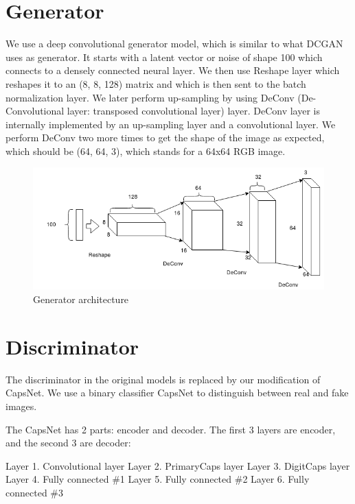 \section{Generator} %
\label{sec:generator}
We use a deep convolutional generator model, which is similar to what DCGAN uses as generator. It starts with a latent vector or noise of shape 100 which connects to a densely connected neural layer. We then use Reshape layer which reshapes it to an (8, 8, 128) matrix and which is then sent to the batch normalization layer. We later perform up-sampling by using DeConv (De-Convolutional layer: transposed convolutional layer) layer. DeConv layer is internally implemented by an up-sampling layer and a convolutional layer. We perform DeConv two more times to get the shape of the image as expected, which should be (64, 64, 3), which stands for a 64x64 RGB image.
\begin{figure}[H]
\centering\includegraphics[width=1\textwidth]{images/Generator.png}
\caption{Generator architecture}
\label{fig:generator}
\end{figure} 



\section{Discriminator} %
\label{sec:discriminator}
The discriminator in the original models is replaced by our modification of CapsNet. We use a binary classifier CapsNet to distinguish between real and fake images. 

\par\bigskip
The CapsNet has 2 parts: encoder and decoder. The first 3 layers are encoder, and the second 3 are decoder:

Layer 1. Convolutional layer
Layer 2. PrimaryCaps layer
Layer 3. DigitCaps layer
Layer 4. Fully connected \#1
Layer 5. Fully connected \#2
Layer 6. Fully connected \#3

